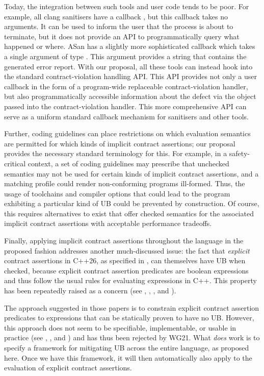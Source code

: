 Today, the integration between such tools and user code tends to be poor. For example, all clang sanitisers have a callback , but this callback takes no arguments. It can be used to inform the user that the process is about to terminate, but it does not provide an API to programmatically query what happened or where. ASan has a slightly more sophisticated callback  which takes a single argument of type . This argument provides a string that contains the generated error report. With our proposal, all these tools can instead hook into the standard contract-violation handling API. This API provides not only a user callback in the form of a  program-wide replaceable contract-violation handler, but also programmatically accessible information about the defect via the  \mbox{} object passed into the contract-violation handler. This more comprehensive API can serve as a uniform standard callback mechanism for sanitisers and other tools.

Further, coding guidelines can place restrictions on which evaluation semantics are permitted for which kinds of implicit contract assertions; our proposal provides the necessary standard terminology for this. For example, in a safety-critical context, a set of coding guidelines may prescribe that unchecked semantics may not be used for certain kinds of implicit contract assertions, and a matching profile could render non-conforming programs ill-formed. Thus, the usage of toolchains and compiler options that could lead to the program exhibiting a particular kind of UB could be prevented by construction. Of course, this requires alternatives to exist that offer checked semantics for the associated implicit contract assertions with acceptable performance tradeoffs.

Finally, applying implicit contract assertions throughout the language in the proposed fashion addresses another much-discussed issue: the fact that \emph{explicit} contract assertions in C++26, as specified in \cite{P2900R14}, can themselves have UB when checked, because explicit contract assertion predicates are boolean expressions and thus follow the usual rules for evaluating expressions in C++. This property has been repeatedly raised as a concern (see \cite{P2680R1}, \cite{P3173R0}, \cite{P3285R0}, and \cite{P3362R0}).

The approach suggested in those papers is to constrain explicit contract assertion predicates to expressions that can be statically proven to have no UB. However, this approach does not seem to be specifiable, implementable, or usable in practice (see  \cite{P3376R0}, \cite{P3386R0}, and \cite{P3499R1}) and has thus been rejected by WG21. What \emph{does} work is to specify a framework for mitigating UB across the entire language, as proposed here. Once we have this framework, it will then automatically also apply to the evaluation of explicit contract assertions.

